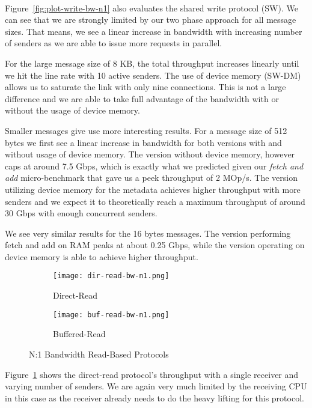\paragraph{} Figure~\ref{fig:plot-write-bw-n1} also evaluates the shared write protocol (SW). We can see that we are strongly limited
by our two phase approach for all message sizes. That means, we see a linear increase in bandwidth with increasing number of 
senders as we are able to issue more requests in parallel.

For the large message size of 8 KB, the total throughput increases linearly until we hit the line rate with 10 
active senders. The use of device memory \mbox{(SW-DM)} allows us to saturate the link with only nine connections.
This is not a 
large difference and we are able to take full advantage of the bandwidth with or without the usage of device memory.

Smaller messages give use more interesting results. For a message size of 512 bytes we first see a linear 
increase in bandwidth for both versions with and without usage of device memory. The version without device memory, however
caps at around 7.5 Gbps, which is exactly what we predicted given our \emph{fetch and add} micro-benchmark that gave us a
peek throughput of 2 MOp/s. The version utilizing device memory for the metadata achieves higher throughput with more
senders and we expect it to theoretically reach a maximum throughput of around 30 Gbps with enough concurrent senders.

We see very similar results for the 16 bytes messages. The version performing fetch and add on RAM peaks at about 0.25 Gbps, 
while the version operating on device memory is able to achieve higher throughput.



\begin{figure}[ht]
  \begin{subfigure}[b]{0.49\textwidth}
  \centering
  \texttt{[image: dir-read-bw-n1.png]}
  \caption{Direct-Read}
  \label{fig:plot-dirread-bw-n1}
  \end{subfigure}
  \begin{subfigure}[b]{0.49\textwidth}
  \centering
  \texttt{[image: buf-read-bw-n1.png]}
  \caption{Buffered-Read}
  \label{fig:plot-bufread-bw-n1}
  \end{subfigure}
  \caption{N:1 Bandwidth Read-Based Protocols}
\end{figure}

Figure~\ref{fig:plot-dirread-bw-n1} shows the direct-read protocol's throughput with a single receiver and varying number of senders.
We are again very much limited by the receiving CPU in this case as the receiver already needs to do the heavy lifting for 
this protocol. 

